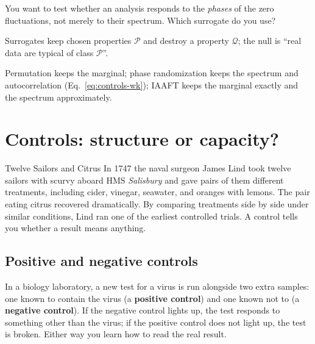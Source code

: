 \begin{checkpoint}
You want to test whether an analysis responds to the \emph{phases} of the zero fluctuations, not merely to their spectrum. Which surrogate do you use?
\end{checkpoint}

\begin{keyideas}
\item Surrogates keep chosen properties $\mathcal P$ and destroy a property $\mathcal Q$; the null is ``real data are typical of class $\mathcal P$''.
\item Permutation keeps the marginal; phase randomization keeps the spectrum and autocorrelation (Eq.~\eqref{eq:controls-wk}); IAAFT keeps the marginal exactly and the spectrum approximately.
\end{keyideas}

\section{Controls: structure or capacity?}\label{sec:controls-capacity}
\begin{didyouknow}{Twelve Sailors and Citrus}
In 1747 the naval surgeon James Lind took twelve sailors with scurvy aboard HMS \emph{Salisbury} and gave pairs of them different treatments, including cider, vinegar, seawater, and oranges with lemons. The pair eating citrus recovered dramatically. By comparing treatments side by side under similar conditions, Lind ran one of the earliest controlled trials. A control tells you whether a result means anything.
\end{didyouknow}

\subsection{Positive and negative controls}

In a biology laboratory, a new test for a virus is run alongside two extra samples: one known to contain the virus (a \textbf{positive control}) and one known not to (a \textbf{negative control}). If the negative control lights up, the test responds to something other than the virus; if the positive control does not light up, the test is broken. Either way you learn how to read the real result.

